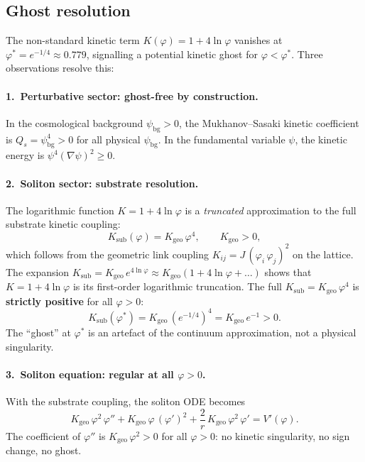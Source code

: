 \subsection{Ghost resolution}\label{ssec:ghost}

The non-standard kinetic term $K(\varphi)=1+4\ln\varphi$ vanishes
at $\varphi^{*}=e^{-1/4}\approx 0.779$, signalling a potential
kinetic ghost for $\varphi < \varphi^{*}$.  Three observations
resolve this:

\paragraph{1.\ Perturbative sector: ghost-free by construction.}
In the cosmological background $\psi_{\mathrm{bg}}>0$, the
Mukhanov--Sasaki kinetic coefficient is
$Q_{s}=\psi_{\mathrm{bg}}^{4}>0$ for all physical
$\psi_{\mathrm{bg}}$.  In the fundamental variable $\psi$,
the kinetic energy is $\psi^{4}(\nabla\psi)^{2}\geq 0$.

\paragraph{2.\ Soliton sector: substrate resolution.}
The logarithmic function $K=1+4\ln\varphi$ is a \emph{truncated}
approximation to the full substrate kinetic coupling:
\begin{equation}\label{eq:K-substrate}
  K_{\mathrm{sub}}(\varphi) = K_{\mathrm{geo}}\,\varphi^{4},
  \qquad K_{\mathrm{geo}} > 0,
\end{equation}
which follows from the geometric link coupling
$K_{ij}=J\,(\varphi_{i}\,\varphi_{j})^{2}$ on the lattice.
The expansion $K_{\mathrm{sub}}=K_{\mathrm{geo}}\,e^{4\ln\varphi}
\approx K_{\mathrm{geo}}(1+4\ln\varphi+\ldots)$ shows that
$K=1+4\ln\varphi$ is its first-order logarithmic truncation.
The full $K_{\mathrm{sub}}=K_{\mathrm{geo}}\,\varphi^{4}$
is \textbf{strictly positive} for all $\varphi>0$:
\begin{equation}
  K_{\mathrm{sub}}(\varphi^{*})
  = K_{\mathrm{geo}}\,(e^{-1/4})^{4}
  = K_{\mathrm{geo}}\,e^{-1} > 0.
\end{equation}
The ``ghost'' at $\varphi^{*}$ is an artefact of the continuum
approximation, not a physical singularity.

\paragraph{3.\ Soliton equation: regular at all $\varphi>0$.}
With the substrate coupling, the soliton ODE becomes
\begin{equation}\label{eq:soliton-substrate}
  K_{\mathrm{geo}}\,\varphi^{2}\,\varphi''
  + K_{\mathrm{geo}}\,\varphi\,(\varphi')^{2}
  + \frac{2}{r}\,K_{\mathrm{geo}}\,\varphi^{2}\,\varphi'
  = V'(\varphi).
\end{equation}
The coefficient of $\varphi''$ is
$K_{\mathrm{geo}}\,\varphi^{2}>0$ for all $\varphi>0$:
no kinetic singularity, no sign change, no ghost.

